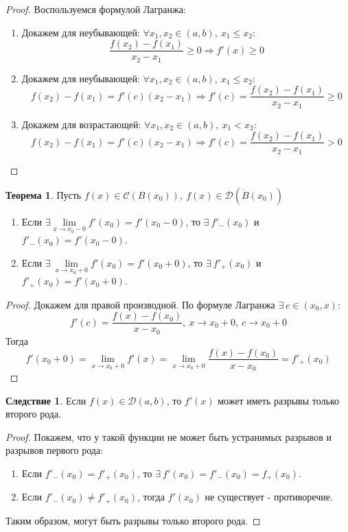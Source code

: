 \documentclass[a4paper, 12pt]{article}
\theoremstyle{definition}
\newtheorem*{theorem}{Теорема}
\newtheorem*{consequense}{Следствие}
\begin{document}
        \begin{proof}Воспользуемся формулой Лагранжа:
            \begin{enumerate}
                \item Докажем для неубывающей: $\forall x_1,x_2\in (a,b),\ x_1\leq x_2:$
                \[\frac{f(x_2)-f(x_1)}{x_2-x_1}\geq 0 \Rightarrow f'(x)\geq 0\]
                \item Докажем для неубывающей: $\forall x_1,x_2\in (a,b),\ x_1\leq x_2:$ 
                \[f(x_2)-f(x_1)=f'(c)(x_2-x_1) \Rightarrow f'(c)=\frac{f(x_2)-f(x_1)}{x_2-x_1}\geq 0\]
                \item Докажем для возрастающей: $\forall x_1,x_2\in (a,b),\ x_1< x_2:$ 
                \[f(x_2)-f(x_1)=f'(c)(x_2-x_1) \Rightarrow f'(c)=\frac{f(x_2)-f(x_1)}{x_2-x_1}> 0\]
            \end{enumerate}
        \end{proof} 
        \begin{theorem}
            Пусть $f(x)\in \mathcal{C}(B(x_0)),\ f(x)\in \mathcal{D}(\mathring{B}(x_0))$
            \begin{enumerate}
                \item Если $\exists \lim\limits_{x\to x_0-0}f'(x_0)=f'(x_0-0)$, то $\exists\ f'_-(x_0)$ и $f'_-(x_0)=f'(x_0-0)$. 
                \item Если $\exists\ \lim\limits_{x\to x_0+0}f'(x_0)=f'(x_0+0)$, то $\exists\ f'_+(x_0)$ и $f'_+(x_0)=f'(x_0+0)$.
            \end{enumerate}
        \end{theorem}
        \begin{proof} Докажем для правой производной. По формуле Лагранжа $\exists\ c\in (x_0, x)$:
            \[f'(c)=\frac{f(x)-f(x_0)}{x-x_0},\ x\to x_0+0,\ c\to x_0+0\]
            Тогда 
            \[f'(x_0+0)=\lim\limits_{x\to x_0+0}f'(x)=\lim\limits_{x\to x_0+0}\frac{f(x)-f(x_0)}{x-x_0}=f'_+(x_0)\]
        \end{proof} 
        \begin{consequense}
            Если $f(x)\in \mathcal{D}(a,b)$, то $f'(x)$ может иметь разрывы только второго рода.
        \end{consequense} 
        \begin{proof} Покажем, что у такой функции не может быть устранимых разрывов и разрывов первого рода:
            \begin{enumerate}
                \item Если $f'_-(x_0)=f'_+(x_0)$, то $\exists\ f'(x_0)=f'_-(x_0)=f_+(x_0)$.
                \item Если $f'_-(x_0)\ne f'_+(x_0)$, тогда $f'(x_0)$ не существует - противоречие.
            \end{enumerate}
            Таким образом, могут быть разрывы только второго рода.
        \end{proof} 
\end{document}
